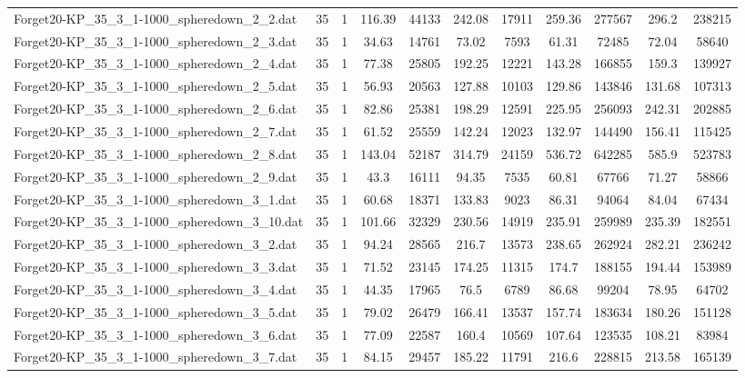 \begin{table}[!ht]
\begin{tabular}{lcccccccccc}
Forget20-KP\_35\_3\_1-1000\_spheredown\_2\_2.dat & 35 & 1 & 116.39 & 44133 & 242.08 & 17911 & 259.36 & 277567 & 296.2 & 238215 \\
Forget20-KP\_35\_3\_1-1000\_spheredown\_2\_3.dat & 35 & 1 & 34.63 & 14761 & 73.02 & 7593 & 61.31 & 72485 & 72.04 & 58640 \\
Forget20-KP\_35\_3\_1-1000\_spheredown\_2\_4.dat & 35 & 1 & 77.38 & 25805 & 192.25 & 12221 & 143.28 & 166855 & 159.3 & 139927 \\
Forget20-KP\_35\_3\_1-1000\_spheredown\_2\_5.dat & 35 & 1 & 56.93 & 20563 & 127.88 & 10103 & 129.86 & 143846 & 131.68 & 107313 \\
Forget20-KP\_35\_3\_1-1000\_spheredown\_2\_6.dat & 35 & 1 & 82.86 & 25381 & 198.29 & 12591 & 225.95 & 256093 & 242.31 & 202885 \\
Forget20-KP\_35\_3\_1-1000\_spheredown\_2\_7.dat & 35 & 1 & 61.52 & 25559 & 142.24 & 12023 & 132.97 & 144490 & 156.41 & 115425 \\
Forget20-KP\_35\_3\_1-1000\_spheredown\_2\_8.dat & 35 & 1 & 143.04 & 52187 & 314.79 & 24159 & 536.72 & 642285 & 585.9 & 523783 \\
Forget20-KP\_35\_3\_1-1000\_spheredown\_2\_9.dat & 35 & 1 & 43.3 & 16111 & 94.35 & 7535 & 60.81 & 67766 & 71.27 & 58866 \\
Forget20-KP\_35\_3\_1-1000\_spheredown\_3\_1.dat & 35 & 1 & 60.68 & 18371 & 133.83 & 9023 & 86.31 & 94064 & 84.04 & 67434 \\
Forget20-KP\_35\_3\_1-1000\_spheredown\_3\_10.dat & 35 & 1 & 101.66 & 32329 & 230.56 & 14919 & 235.91 & 259989 & 235.39 & 182551 \\
Forget20-KP\_35\_3\_1-1000\_spheredown\_3\_2.dat & 35 & 1 & 94.24 & 28565 & 216.7 & 13573 & 238.65 & 262924 & 282.21 & 236242 \\
Forget20-KP\_35\_3\_1-1000\_spheredown\_3\_3.dat & 35 & 1 & 71.52 & 23145 & 174.25 & 11315 & 174.7 & 188155 & 194.44 & 153989 \\
Forget20-KP\_35\_3\_1-1000\_spheredown\_3\_4.dat & 35 & 1 & 44.35 & 17965 & 76.5 & 6789 & 86.68 & 99204 & 78.95 & 64702 \\
Forget20-KP\_35\_3\_1-1000\_spheredown\_3\_5.dat & 35 & 1 & 79.02 & 26479 & 166.41 & 13537 & 157.74 & 183634 & 180.26 & 151128 \\
Forget20-KP\_35\_3\_1-1000\_spheredown\_3\_6.dat & 35 & 1 & 77.09 & 22587 & 160.4 & 10569 & 107.64 & 123535 & 108.21 & 83984 \\
Forget20-KP\_35\_3\_1-1000\_spheredown\_3\_7.dat & 35 & 1 & 84.15 & 29457 & 185.22 & 11791 & 216.6 & 228815 & 213.58 & 165139 \\

\end{tabular}
\end{table}
